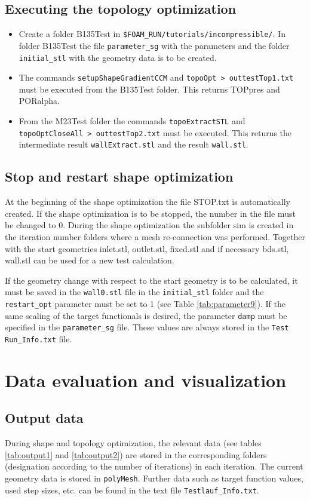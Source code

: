 \documentclass[oneside]{article}
\numberwithin{equation}{section}
\numberwithin{figure}{section}
\numberwithin{figure}{section}
\begin{document}
\subsection{Executing the topology optimization}
\begin{itemize}
    \item Create a folder B135Test in \verb|$FOAM_RUN/tutorials/incompressible/|.
    In folder B135Test the file \verb|parameter_sg| with the parameters and the folder \verb|initial_stl| with the geometry data is to be created.
    \item The commands \texttt{setupShapeGradientCCM} and \texttt{topoOpt > outtestTop1.txt} must be executed from the B135Test folder. This returns TOPpres and PORalpha.
    \item From the M23Test folder the commands \texttt{topoExtractSTL} and \texttt{topoOptCloseAll > outtestTop2.txt} must be executed. This returns the intermediate result \texttt{wallExtract.stl} and the result \texttt{wall.stl}.
\end{itemize}

\subsection{Stop and restart shape optimization}
At the beginning of the shape optimization the file STOP.txt is automatically created. If the shape optimization is to be stopped, the number in the file must be changed to 0. During the shape optimization the subfolder sim is created in the iteration number folders where a mesh re-connection was performed. Together with the start geometries inlet.stl, outlet.stl, fixed.stl and if necessary bds.stl, wall.stl can be used for a new test calculation.

If the geometry change with respect to the start geometry is to be calculated, it must be saved in the \texttt{wall0.stl} file in the \verb|initial_stl| folder and the \verb|restart_opt| parameter must be set to 1 (see Table \ref{tab:parameter9}). If the same scaling of the target functionals is desired, the parameter \texttt{damp} must be specified in the \verb|parameter_sg| file. These values are always stored in the \verb|Test Run_Info.txt| file.

\section{Data evaluation and visualization}

\subsection{Output data}
During shape and topology optimization, the relevant data (see tables \ref{tab:output1} and \ref{tab:output2}) are stored in the corresponding folders (designation according to the number of iterations) in each iteration. The current geometry data is stored in \texttt{polyMesh}. Further data such as target function values, used step sizes, etc. can be found in the text file \verb|Testlauf_Info.txt|.
\end{document}
